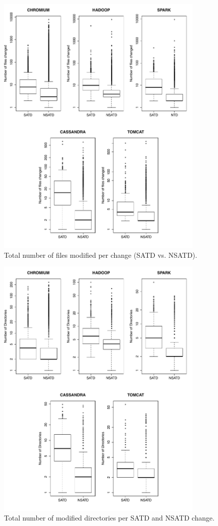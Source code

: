 \begin{figure}[!hp]
	\centering
	\includegraphics[width=100mm]{figures/chapter3/number_of_files_changed_all_projects}
	\caption{Total number of files modified per change (SATD vs. NSATD).}
	\label{figure:tfcpc}
\end{figure}

\begin{figure}[!hp]
	\centering
	\includegraphics[width=100mm]{figures/chapter3/number_of_directories}
	\caption{Total number of modified directories per SATD and NSATD change.}
	\label{figure:number_of_directories}
\end{figure}


